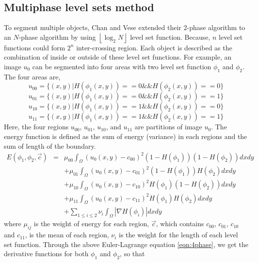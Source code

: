 \subsection{Multiphase level sets method}
To segment multiple objects, Chan and Vese extended their 2-phase algorithm to an $N$-phase algorithm by using $\left \lfloor \log_2N \right \rfloor$ level set function. Because, $n$ level set functions could form $2^n$ inter-crossing region. Each object is described as the combination of inside or outside of these level set functions. For example, an image $u_0$ can be segmented into four areas with two level set function $\phi_1$ and $\phi_2$. The four areas are,
\begin{equation}
u_{00} = \{(x,y) | H(\phi_1(x,y)) == 0 \&\& H(\phi_2(x,y)) == 0\}
\end{equation}
\begin{equation}
u_{01} = \{(x,y) | H(\phi_1(x,y)) == 0 \&\& H(\phi_2(x,y)) == 1\}
\end{equation}
\begin{equation}
u_{10} = \{(x,y) | H(\phi_1(x,y)) == 1 \&\& H(\phi_2(x,y)) == 0\}
\end{equation}
\begin{equation}
u_{11} = \{(x,y) | H(\phi_1(x,y)) == 1 \&\& H(\phi_2(x,y)) == 1\} 
\end{equation}
Here, the four regions $u_{00}$, $u_{01}$, $u_{10}$, and $u_{11}$ are partitions of image $u_0$. The energy function is defined as the sum of energy (variance) in each regions and the sum of length of the boundary.
\begin{eqnarray}
\nonumber
E(\phi_1,\phi_2, \vec{c}) & = & \mu_{00}\int_{\Omega}(u_0(x,y) - c_{00})^2(1-H(\phi_1))(1-H(\phi_2))dxdy \\
\nonumber
& & + \mu_{01}\int_{\Omega}(u_0(x,y) - c_{01})^2(1-H(\phi_1))H(\phi_2)dxdy \\
\label{eqn:4phase}
& & + \mu_{10}\int_{\Omega}(u_0(x,y) - c_{10})^2H(\phi_1)(1-H(\phi_2))dxdy \\
\nonumber
& & + \mu_{11}\int_{\Omega}(u_0(x,y) - c_{11})^2H(\phi_1)H(\phi_2)dxdy \\
\nonumber
& & + \sum_{1 \le i \le 2}\nu_i\int_{\Omega}|\nabla H(\phi_i)|dxdy
\end{eqnarray}
where $\mu_{ij}$ is the weight of energy for each region, $\vec{c}$, which contains $c_{00}$, $c_{01}$, $c_{10}$ and $c_{11}$, is the mean of each region, $\nu_i$ is the weight for the length of each level set function. Through the above Euler-Lagrange equation \ref{eqn:4phase}, we get the derivative functions for both $\phi_1$ and $\phi_2$, so that
